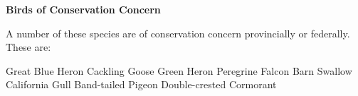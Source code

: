 \textbf{Birds of Conservation Concern}

A number of these species are of conservation concern provincially or
federally. These are:

Great Blue Heron\newline
Cackling Goose\newline
Green Heron\newline
Peregrine Falcon\newline
Barn Swallow\newline
California Gull\newline
Band-tailed Pigeon\newline
Double-crested Cormorant\newline

